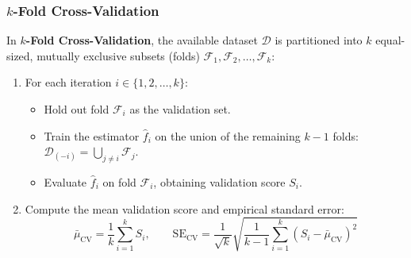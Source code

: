 \subsubsection{$k$-Fold Cross-Validation}

In \textbf{$k$-Fold Cross-Validation}, the available dataset $\mathcal{D}$ is partitioned into $k$ equal-sized, mutually exclusive subsets (folds) $\mathcal{F}_1, \mathcal{F}_2, \dots, \mathcal{F}_k$:
\begin{enumerate}
    \item For each iteration $i \in \{1, 2, \dots, k\}$:
    \begin{itemize}
        \item Hold out fold $\mathcal{F}_i$ as the validation set.
        \item Train the estimator $\hat{f}_i$ on the union of the remaining $k-1$ folds: $\mathcal{D}_{(-i)} = \bigcup_{j \ne i} \mathcal{F}_j$.
        \item Evaluate $\hat{f}_i$ on fold $\mathcal{F}_i$, obtaining validation score $S_i$.
    \end{itemize}
    \item Compute the mean validation score and empirical standard error:
    \begin{equation}
    \bar{\mu}_{\text{CV}} = \frac{1}{k}\sum_{i=1}^k S_i, \qquad \text{SE}_{\text{CV}} = \frac{1}{\sqrt{k}} \sqrt{\frac{1}{k-1}\sum_{i=1}^k (S_i - \bar{\mu}_{\text{CV}})^2}\label{eq:cv_mean_se}
    \end{equation}
\end{enumerate}


